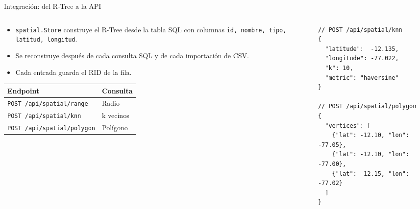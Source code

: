 \documentclass[aspectratio=169,10pt]{beamer}
\begin{document}
\begin{frame}[fragile]{Integración: del R-Tree a la API}
  \begin{columns}[T]
    \begin{column}{0.48\textwidth}
      \small
      \begin{itemize}
        \item \texttt{spatial.Store} construye el R-Tree desde la tabla SQL con columnas \texttt{id, nombre, tipo, latitud, longitud}.
        \item Se reconstruye después de cada consulta SQL y de cada importación de CSV.
        \item Cada entrada guarda el RID de la fila.
      \end{itemize}
      \vspace{0.3em}
      \begin{tabular}{@{}ll@{}}
        \toprule
        \textbf{Endpoint} & \textbf{Consulta} \\
        \midrule
        \texttt{POST /api/spatial/range} & Radio \\
        \texttt{POST /api/spatial/knn} & k vecinos \\
        \texttt{POST /api/spatial/polygon} & Polígono \\
        \bottomrule
      \end{tabular}
    \end{column}
    \begin{column}{0.5\textwidth}
\begin{lstlisting}
// POST /api/spatial/knn
{
  "latitude":  -12.135,
  "longitude": -77.022,
  "k": 10,
  "metric": "haversine"
}

// POST /api/spatial/polygon
{
  "vertices": [
    {"lat": -12.10, "lon": -77.05},
    {"lat": -12.10, "lon": -77.00},
    {"lat": -12.15, "lon": -77.02}
  ]
}
\end{lstlisting}
    \end{column}
  \end{columns}
\end{frame}
\end{document}
